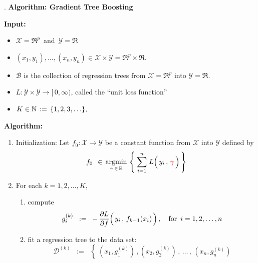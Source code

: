 \begin{center}
\begin{minipage}{6in}
\begin{tcolorbox}[width=0.95\linewidth,colback=white,colframe=gray]
	\begin{center}
	{\color{white}.}\vskip 0.1cm
	\textbf{\large Algorithm: Gradient Tree Boosting}
	\end{center}
	\textbf{Input:}
	\begin{itemize}
	\item
		$\mathcal{X} = \Re^{p}$\, and \,$\mathcal{Y} = \Re$
	\item
		$(x_{1},y_{1}), \ldots, (x_{n},y_{n}) \in \mathcal{X} \times \mathcal{Y} = \Re^{p} \times \Re$.
	\item
		$\mathcal{B}$ is the collection of regression trees from $\mathcal{X} = \Re^{p}$ into $\mathcal{Y} = \Re$.
	\item
		$L : \mathcal{Y} \times \mathcal{Y} \longrightarrow [\,0,\infty)$, called the ``unit loss function''
	\item
		$K \in \mathbb{N} \,:=\, \{1,2,3,\ldots\}$.
	\end{itemize}
	\textbf{Algorithm:}
	\begin{enumerate}
	\item
		Initialization:
		Let $f_{0} : \mathcal{X} \longrightarrow \mathcal{Y}$ be a constant function from $\mathcal{X}$ into $\mathcal{Y}$
		defined by
		\begin{equation*}
		f_{0}
		\;\,\in\,
			\underset{\gamma \,\in\, \Re}{\argmin}\,
			\left\{\;
				\overset{n}{\underset{i=1}{\sum}}\;
				L\!\left(\,y_{i}\,,\,\overset{{\color{white}1}}{{\color{red}\gamma}}\,\right)
				\,\right\}
		\end{equation*}
	\item
		For each $k = 1, 2, ... , K$, 
		\begin{enumerate}
		\item
			compute
			\begin{equation*}
			g^{(k)}_{i}
			\;\; := \;\;
				-\,\dfrac{\partial L}{\partial f}\!\left(\,y_{i}\,,\,\overset{{{\color{white}.}}}{f_{k-1}(x_{i})}\,\right),
			\quad
			\textnormal{for \,$i = 1,2,\ldots,n$}
			\end{equation*}
		\item
			fit a regression tree to the data set:
			\begin{equation*}
			\mathscr{D}^{(k)}
			\;\; := \;\;
				\left\{\;
					(x_{1},g^{(k)}_{1})\,,
					(x_{2},g^{(k)}_{2})\,,
					\,\ldots\,,\,
					(x_{n},g^{(k)}_{n})

\end{equation*}
\end{enumerate}
\end{enumerate}
\end{tcolorbox}
\end{minipage}
\end{center}
